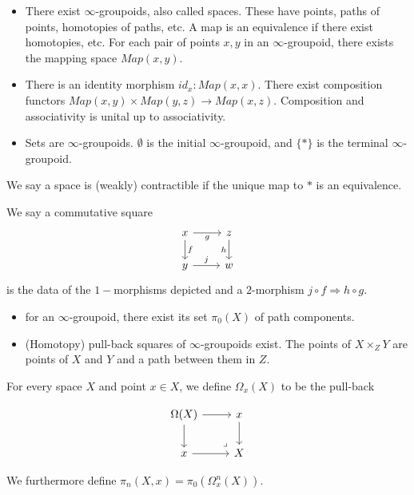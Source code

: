 \begin{itemize}
    \item There exist $\infty$-groupoids, also called spaces. These have points, paths of points, homotopies of paths, etc. A map is an equivalence if there exist homotopies, etc. For each pair of points $x,y$ in an $\infty$-groupoid, there exists the mapping space $Map(x,y)$.
    \item There is an identity morphism $id_x:Map(x,x)$. There exist composition functors $Map(x,y)\times Map(y,z)\rightarrow Map(x,z)$. Composition and associativity is unital up to associativity.
    \item Sets are $\infty$-groupoids. $\emptyset$ is the initial $\infty$-groupoid, and $\{*\}$ is the terminal $\infty$-groupoid.
\end{itemize}
\begin{definition}
    We say a space is (weakly) contractible if the unique map to $*$ is an equivalence.
\end{definition}
\begin{definition}
    We say a commutative square
\[\begin{tikzcd}
	x & z \\
	y & w
	\arrow["g"', from=1-1, to=1-2]
	\arrow["f", from=1-1, to=2-1]
	\arrow["h"', from=1-2, to=2-2]
	\arrow["j", from=2-1, to=2-2]
\end{tikzcd}\]
is the data of the $1-$morphisms depicted and a $2$-morphism $j\circ f\Rightarrow h\circ g$.
    
\end{definition}
\begin{itemize}
    \item for an $\infty$-groupoid, there exist its set $\pi_0(X)$ of path components.
    \item (Homotopy) pull-back squares of $\infty$-groupoids exist. The points of $X\times_Z Y$ are points of $X$ and $Y$ and a path between them in $Z.$
\end{itemize}

\begin{definition}
    For every space $X$ and point $x\in X$,  we define $\Omega_x(X)$ to be the pull-back

\[\begin{tikzcd}
	\Omega(X) & x \\
	x & {X}
	\arrow[from=1-1, to=1-2]
	\arrow[from=1-1, to=2-1]
	\arrow[from=1-2, to=2-2]
	\arrow[from=2-1, to=2-2]
	\arrow["\ulcorner"{anchor=center, pos=0.125, rotate=180}, draw=none, from=2-2, to=1-1]
\end{tikzcd}\]

    We furthermore define $\pi_n(X,x)=\pi_0(\Omega_x^n(X))$.
\end{definition}

